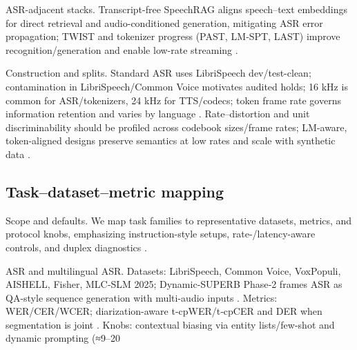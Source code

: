 ASR-adjacent stacks. Transcript-free SpeechRAG aligns speech–text embeddings for direct retrieval and audio-conditioned generation, mitigating ASR error propagation; TWIST and tokenizer progress (PAST, LM‑SPT, LAST) improve recognition/generation and enable low-rate streaming \cite{min2025speechretrievalaugmentedgenerationwithou,hassid2024textuallypretrainedspeechlanguagemodels,har-tuv2025pastphoneticacousticspeechtokenizer,jo2025lmsptalignedsemanticdistillationspeechto,turetzky2024lastlanguagemodelawarespeechtokenization}.

Construction and splits. Standard ASR uses LibriSpeech dev/test-clean; contamination in LibriSpeech/Common Voice motivates audited holds; 16 kHz is common for ASR/tokenizers, 24 kHz for TTS/codecs; token frame rate governs information retention and varies by language \cite{tseng2025evaluationllmsspeechisoftenflawedtestset,zhang2025impactframeratesspeechtokenizercasestudy,li2024investigatingneuralaudiocodecsspeechlang,ye2024codecdoesmatterexploringsemanticshortcom,li2024effectivenessacousticbpedecoderonlytts}. Rate–distortion and unit discriminability should be profiled across codebook sizes/frame rates; LM-aware, token-aligned designs preserve semantics at low rates and scale with synthetic data \cite{turetzky2024lastlanguagemodelawarespeechtokenization,maimon2025scalinganalysisinterleavedspeechtextlang,zeng2024scalingspeechtextpretrainingsyntheticint,hassid2024textuallypretrainedspeechlanguagemodels,guo2025fastlongspeechenhancinglargespeechlangua}.

\subsection{Task–dataset–metric mapping} \label{subsec:Task–dataset–metric mapping}

Scope and defaults. We map task families to representative datasets, metrics, and protocol knobs, emphasizing instruction-style setups, rate-/latency-aware controls, and duplex diagnostics \cite{vashishth2024stabspeechtokenizerassessmentbenchmark,entry2025indicsuperbspeechprocessinguniversalperf}.

ASR and multilingual ASR. Datasets: LibriSpeech, Common Voice, VoxPopuli, AISHELL, Fisher, MLC‑SLM 2025; Dynamic‑SUPERB Phase‑2 frames ASR as QA-style sequence generation with multi-audio inputs \cite{huang2025dynamicsuperbphase2collaborativelyexpand,li2025seewossubmissionmlcslmlessonslearnedspee}. Metrics: WER/CER/WCER; diarization-aware t‑cpWER/t‑cpCER and DER when segmentation is joint \cite{kando2025exploringeffectsegmentationvocabularysiz}. Knobs: contextual biasing via entity lists/few-shot and dynamic prompting (≈9–20%

